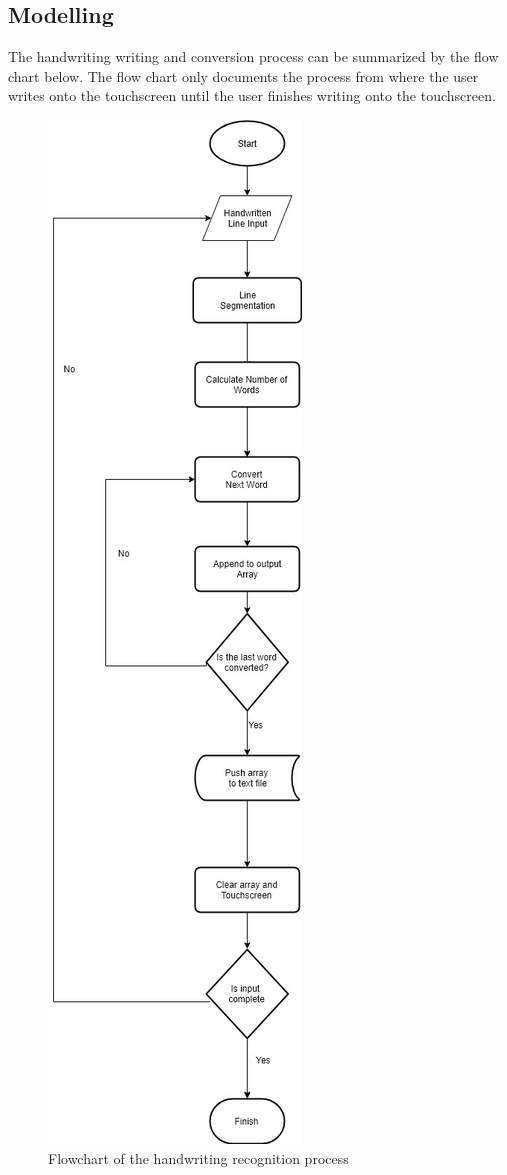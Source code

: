 \subsection{Modelling}

The handwriting writing and conversion process can be summarized by the flow chart below. The flow chart only documents the process from where the user writes onto the touchscreen until the user finishes writing onto the touchscreen.
\clearpage
\begin{figure}[h]
	\centering
	\includegraphics[scale=0.5]{34}
	\caption{Flowchart of the handwriting recognition process}
\end{figure}
\clearpage

